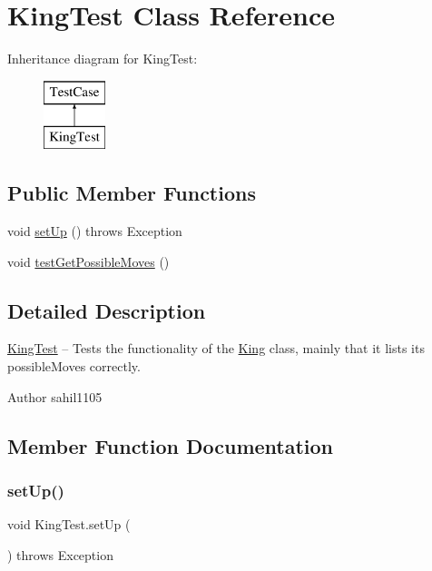 \hypertarget{class_king_test}{}\section{King\+Test Class Reference}
\label{class_king_test}
Inheritance diagram for King\+Test\+:\begin{figure}[H]
\begin{center}
\leavevmode
\includegraphics[height=2.000000cm]{class_king_test}
\end{center}
\end{figure}
\subsection*{Public Member Functions}
\begin{DoxyCompactItemize}
\item 
void \mbox{\hyperlink{class_king_test_ae407e6abfb5227aea95267141bff2744}{set\+Up}} ()  throws Exception 
\item 
void \mbox{\hyperlink{class_king_test_af758164095ca29c3ce8ff7aea3291f2a}{test\+Get\+Possible\+Moves}} ()
\end{DoxyCompactItemize}


\subsection{Detailed Description}
\mbox{\hyperlink{class_king_test}{King\+Test}} -- Tests the functionality of the \mbox{\hyperlink{class_king}{King}} class, mainly that it lists its possible\+Moves correctly. \begin{DoxyAuthor}{Author}
sahil1105 
\end{DoxyAuthor}


\subsection{Member Function Documentation}
\mbox{\label{class_king_test_ae407e6abfb5227aea95267141bff2744}} 
\subsubsection{\texorpdfstring{set\+Up()}{setUp()}}
{\footnotesize\ttfamily void King\+Test.\+set\+Up (\begin{DoxyParamCaption}{ }\end{DoxyParamCaption}) throws Exception}

